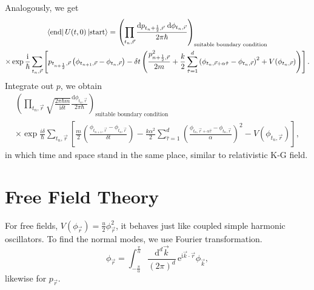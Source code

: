 Analogously, we get
\begin{equation}
    \begin{gathered}
        \bra{\text{end}}U(t,0)\ket{\text{start}} = 
        \left( \prod_{t_n, \vec{r}} \frac{\mathrm{d} p_{t_n+\frac{1}{2}, \vec{r}} \ \mathrm{d} \phi_{t_n, \vec{r}}}{2\pi\hbar}  \right) _{\text{suitable boundary condition}}
        \\
        \times \exp
        \frac{\mathrm{i} }{\hbar} \sum_{t_n, \vec{r}}\left[ 
            p _{t_{n+\frac{1}{2}}, \vec{r}}\left( \phi_{t_{n+1}, \vec{r}} - \phi_{t_n, \vec{r}} \right)
            -\delta t \left( 
                \frac{p_{n+ \frac{1}{2}, \vec{r}}^2}{2m} + \frac{k}{2} \sum_{\hat{\tau} = 1}^d \left( \phi_{t_{n}, \vec{r} + \alpha \hat{\tau} } - \phi_{t_n, \vec{r}} \right) ^2 + V(\phi_{t_n, \vec{r}})
             \right)  
         \right] .
    \end{gathered}
\end{equation}
Integrate out $p$, we obtain
\begin{equation}
  \begin{gathered}
    \left( \prod_{t_n, \vec{r}} \sqrt{\frac{2\pi\hbar m}{\mathrm{i} \delta t}} \frac{\mathrm{d} \phi_{t_n, \vec{r}}}{2\pi\hbar}  \right) _{\text{suitable boundary condition}}
    \\
    \times 
    \exp \frac{i\delta}{\hbar} \sum_{t_n, \vec{r}} 
     \left[  
            \frac{m}{2}\left( \frac{\phi_{t_{n+1},\vec{r}} - \phi_{t_n, \vec{r}}}{\delta t} \right)  - \frac{k\alpha^2}{2} \sum_{\hat{\tau} = 1}^d \left( \frac{\phi_{t_{n}, \vec{r} + \alpha \hat{\tau} } - \phi_{t_n, \vec{r}}}{\alpha} \right) ^2 - V(\phi_{t_n, \vec{r}})
     \right],
  \end{gathered}
\end{equation}
in which time and space stand in the same place, similar to relativistic K-G field.


\section{Free Field Theory}
For free fields, $V(\phi_{\vec{r}}) = \frac{u}{2}\phi_{\vec{r}}^2$, it behaves just like coupled simple harmonic oscillators.
To find the normal modes, we use Fourier transformation.
\begin{equation}
  \phi_{\vec{r}} = \int_{-\frac{\pi}{\alpha}}^{\frac{\pi}{\alpha}} \frac{\mathrm{d}^d \vec{k}}{(2\pi)^d} \, \mathrm{e}^{\mathrm{i} \vec{k}\cdot \vec{r}}\phi_{\vec{k}} ,
\end{equation}
likewise for $p_{\vec{r}}$.

